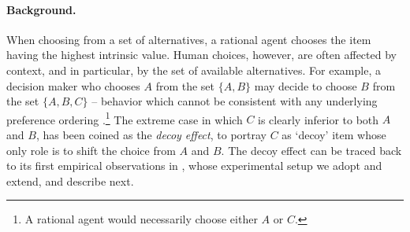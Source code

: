 \paragraph{Background.} 
When choosing from a set of alternatives, a rational agent chooses the item having the highest intrinsic value.
Human choices, however, are often affected by context, and in particular,
by the set of available alternatives.
For example, a decision maker who chooses $A$ from the set $\{A, B\}$
may decide to choose $B$ from the set $\{A,B,C\}$ -- behavior which cannot be consistent with any underlying preference ordering \citep{mcfadden1974conditional}.\footnote{A rational agent would necessarily choose either $A$ or $C$.}
The extreme case in which $C$ is clearly inferior to both $A$ and $B$,
has been coined as the \emph{decoy effect}, to portray $C$ as `decoy' item
whose only role is to shift the choice from $A$ and $B$.
The decoy effect can be traced back to its first empirical observations in \citet{huber1982adding},
whose experimental setup we adopt and extend, and describe next.






